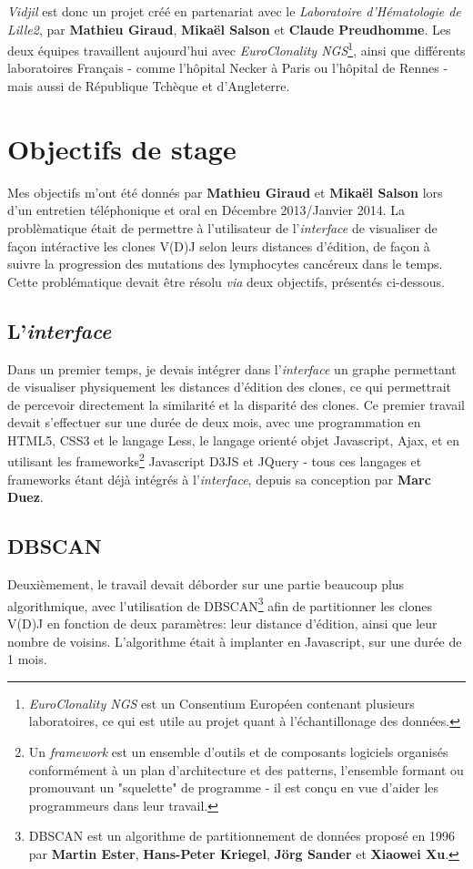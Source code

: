 \documentclass[pdftex,12pt,a4paper]{report}
\begin{document}
\begin{spacing}{1.2}
\textit{Vidjil} est donc un projet créé en partenariat avec le \textit{Laboratoire d'Hématologie de Lille2}, par \textbf{Mathieu Giraud}, \textbf{Mikaël Salson} et \textbf{Claude Preudhomme}.
Les deux équipes travaillent aujourd'hui avec \textit{EuroClonality NGS}\footnote{\textit{EuroClonality NGS} est un Consentium Européen contenant plusieurs laboratoires, ce qui est utile au projet quant à l'échantillonage des données.}, ainsi que différents laboratoires Français - comme l'hôpital Necker à Paris ou l'hôpital de Rennes - mais aussi de République Tchèque et d'Angleterre.

\section{Objectifs de stage}
Mes objectifs m'ont été donnés par \textbf{Mathieu Giraud} et \textbf{Mikaël Salson} lors d'un entretien téléphonique et oral en Décembre 2013/Janvier 2014.
\newline
La problèmatique était de permettre à l'utilisateur de l'\textit{interface} de visualiser de façon intéractive les clones V(D)J selon leurs distances d'édition, de façon à suivre la progression des mutations des lymphocytes cancéreux dans le temps.
\newline
Cette problématique devait être résolu \textit{via} deux objectifs, présentés ci-dessous. 

\subsection*{L'\textit{interface}}
Dans un premier temps, je devais intégrer dans l'\textit{interface} un graphe permettant de visualiser physiquement les distances d'édition des clones, ce qui permettrait de percevoir directement la similarité et la disparité des clones.
\newline
Ce premier travail devait s'effectuer sur une durée de deux mois, avec une programmation en HTML5, CSS3 et le langage Less, le langage orienté objet Javascript, Ajax, et en utilisant les frameworks\footnote{Un \textit{framework} est un ensemble d'outils et de composants logiciels organisés conformément à un plan d'architecture et des patterns, l'ensemble formant ou promouvant un "squelette" de programme - il est conçu en vue d'aider les programmeurs dans leur travail.} Javascript D3JS et JQuery - tous ces langages et frameworks étant déjà intégrés à l'\textit{interface}, depuis sa conception par \textbf{Marc Duez}.

\subsection*{DBSCAN}
Deuxièmement, le travail devait déborder sur une partie beaucoup plus algorithmique, avec l'utilisation de DBSCAN\footnote{DBSCAN est un algorithme de partitionnement de données proposé en 1996 par \textbf{Martin Ester}, \textbf{Hans-Peter Kriegel}, \textbf{Jörg Sander} et \textbf{Xiaowei Xu}.} afin de partitionner les clones V(D)J en fonction de deux paramètres: leur distance d'édition, ainsi que leur nombre de voisins.
\newline
L'algorithme était à implanter en Javascript, sur une durée de 1 mois.


\end{spacing}
\end{document}
